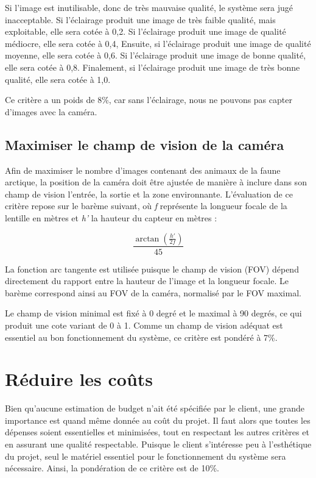 Si l’image est inutilisable, donc de très mauvaise qualité, le système sera
jugé inacceptable. Si l’éclairage produit une image de très faible qualité,
mais exploitable, elle sera cotée à 0,2. Si l’éclairage produit une image de
qualité médiocre, elle sera cotée à 0,4, Ensuite, si l’éclairage produit une
image de qualité moyenne, elle sera cotée à 0,6. Si l’éclairage produit une
image de bonne qualité, elle sera cotée à 0,8. Finalement, si l’éclairage
produit une image de très bonne qualité, elle sera cotée à 1,0.

Ce critère a un poids de 8\%, car sans l’éclairage, nous ne pouvons pas capter
d’images avec la caméra.

\subsection{Maximiser le champ de vision de la caméra}

Afin de maximiser le nombre d’images contenant des animaux de la faune
arctique, la position de la caméra doit être ajustée de manière à inclure dans
son champ de vision l’entrée, la sortie et la zone environnante. L’évaluation
de ce critère repose sur le barème suivant, où \textit{f} représente la
longueur focale de la lentille en mètres et \textit{h'} la hauteur du capteur en mètres :

\begin{equation}
  \frac{\arctan\!\left(\frac{h'}{2f}\right)}{45}
\end{equation}

La fonction arc tangente est utilisée puisque le champ de vision (FOV) dépend
directement du rapport entre la hauteur de l’image et la longueur focale. Le
barème correspond ainsi au FOV de la caméra, normalisé par le FOV maximal.

Le champ de vision minimal est fixé à 0 degré et le maximal à 90 degrés, ce qui
produit une cote variant de 0 à 1. Comme un champ de vision adéquat est
essentiel au bon fonctionnement du système, ce critère est pondéré à 7\%.

\section{Réduire les coûts}

Bien qu’aucune estimation de budget n’ait été spécifiée par le client, une
grande importance est quand même donnée au coût du projet. Il faut alors que
toutes les dépenses soient essentielles et minimisées, tout en respectant les
autres critères et en assurant une qualité respectable. Puisque le client
s’intéresse peu à l’esthétique du projet, seul le matériel essentiel pour le
fonctionnement du système sera nécessaire. Ainsi, la pondération de ce critère
est de 10\%.

